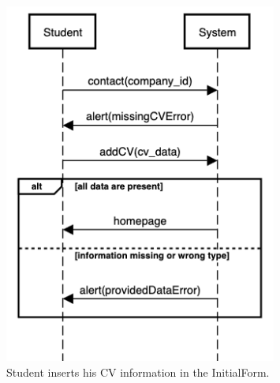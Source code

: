     \begin{figure}[H]
        \centering
        \includegraphics[width=0.8\textwidth]{RASD/Assets/SequenceDiagrams/2-student-provide-his-cv.png}
        \caption{Student inserts his CV information in the InitialForm.}
        \label{fig:Student inserts his CV information in the InitialForm}
    \end{figure}



